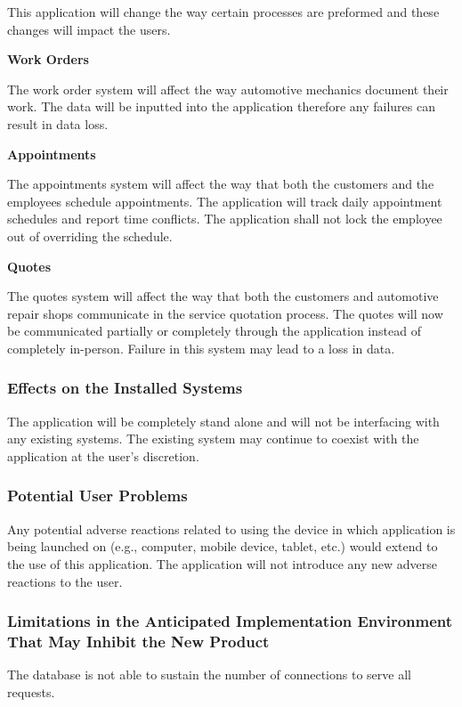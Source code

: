 \documentclass[12pt]{article}
\begin{document}
This application will change the way certain processes are preformed and these changes will impact
the users.

\textbf{Work Orders}

The work order system will affect the way automotive mechanics document their work. The data will
be inputted into the application therefore any failures can result in data loss.

\textbf{Appointments}

The appointments system will affect the way that both the customers and the employees schedule
appointments. The application will track daily appointment schedules and report time conflicts. The
application shall not lock the employee out of overriding the schedule.

\textbf{Quotes}

The quotes system will affect the way that both the customers and automotive repair shops
communicate in the service quotation process. The quotes will now be communicated partially or
completely through the application instead of completely in-person. Failure in this system may lead
to a loss in data.

\subsubsection{Effects on the Installed Systems}

The application will be completely stand alone and will not be interfacing with any existing
systems. The existing system may continue to coexist with the application at the user's discretion.

\subsubsection{Potential User Problems}

Any potential adverse reactions related to using the device in which application is being launched
on (e.g., computer, mobile device, tablet, etc.) would extend to the use of this application. The
application will not introduce any new adverse reactions to the user.

\subsubsection{Limitations in the Anticipated Implementation Environment That May Inhibit the New Product}

The database is not able to sustain the number of connections to serve all requests.
\end{document}
